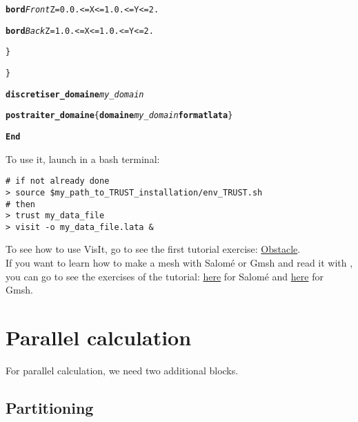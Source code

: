 \begin{center}
{\begin{minipage}[c]{0.8\textwidth}
\begin{alltt}
\hspace{2cm}        {\bf{bord}} \textit{Front}  \hspace{0.25cm} Z = 0. 0. <= X <= 1.  0. <= Y <= 2.

\hspace{2cm}        {\bf{bord}} \textit{Back}   \hspace{0.45cm} Z = 1. 0. <= X <= 1.  0. <= Y <= 2.

\hspace{1cm}    \}

\}

{\bf{discretiser\_domaine}} \textit{my\_domain}

{\bf{postraiter\_domaine}} \{ {\bf{domaine}} \textit{my\_domain} {\bf{format lata}} \}

{\bf{End}}
    \end{alltt}
\end{minipage}}
\end{center}

To use it, launch in a bash terminal:
\begin{verbatim}
# if not already done
> source $my_path_to_TRUST_installation/env_TRUST.sh
# then
> trust my_data_file
> visit -o my_data_file.lata &
\end{verbatim}

To see how to use VisIt, go to see the first tutorial exercise: \href{TRUST_tutorial.pdf\#exo1}{Obstacle}.\\

If you want to learn how to make a mesh with Salom\'e or Gmsh and read it with \trust, you can go to see the exercises of the \trust tutorial: \href{TRUST_tutorial.pdf\#salome}{here} for Salom\'e and \href{TRUST_tutorial.pdf\#gmsh}{here} for Gmsh.



\section{Parallel calculation}
For parallel calculation, we need two additional blocks.


\subsection{Partitioning}


